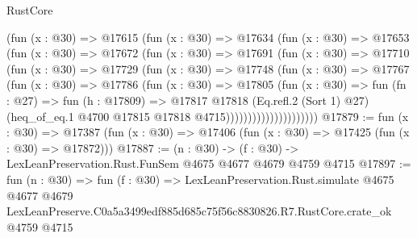 \begin{lexlean}{RustCore}
\begin{coremodule}
                    (fun (x : @30) =>
                    @17615
                      (fun (x : @30) =>
                      @17634
                        (fun (x : @30) =>
                        @17653
                          (fun (x : @30) =>
                          @17672
                            (fun (x : @30) =>
                            @17691
                              (fun (x : @30) =>
                              @17710
                                (fun (x : @30) =>
                                @17729
                                  (fun (x : @30) =>
                                  @17748
                                    (fun (x : @30) =>
                                    @17767
                                      (fun (x : @30) =>
                                      @17786
                                        (fun (x : @30) =>
                                        @17805
                                          (fun (x : @30) =>
                                          fun (fn : @27) =>
                                          fun (h : @17809) =>
                                          @17817
                                            @17818
                                            (Eq.refl.{2} (Sort 1) @27)
                                            (heq_of_eq.{1}
                                              @4700
                                              @17815
                                              @17818
                                              @4715)))))))))))))))))))))
@17879 := fun (x : @30) =>
  @17387 (fun (x : @30) => @17406 (fun (x : @30) => @17425 (fun (x : @30) => @17872)))
@17887 := (n : @30) -> (f : @30) -> LexLeanPreservation.Rust.FunSem @4675 @4677 @4679 @4759 @4715
@17897 := fun (n : @30) =>
  fun (f : @30) =>
  LexLeanPreservation.Rust.simulate
    @4675
    @4677
    @4679
    LexLeanPreserve.C0a5a3499edf885d685c75f56c8830826.R7.RustCore.crate_ok
    @4759
    @4715
\end{coremodule}
\end{lexlean}
